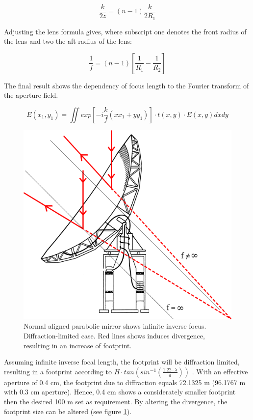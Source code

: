 \begin{equation} 
\frac{k}{2z}=(n-1)\frac{k}{2R_{1}}
\end{equation} 

Adjusting the lens formula gives, where subscript one denotes the front radius of the lens and two the aft radius of the lens:

\begin{equation} 
\frac{1}{f}=\left(n-1\right)\left[\frac{1}{R_{1}}-\frac{1}{R_{2}}\right]
\end{equation} 

The final result shows the dependency of focus length to the Fourier transform of the aperture field. 

\begin{equation} 
E(x_{1},y_{1})=\iint exp\left[-i\frac{k}{f}\left(xx_{1}+yy_{1}\right)\right]\cdot t(x,y)\cdot E(x,y) dx dy
\end{equation}


\begin{figure} [ht]
\centering
\includegraphics[scale=0.4]{chapters/img/optic_focus.png}	
\caption{Normal aligned parabolic mirror shows infinite inverse focus. Diffraction-limited case. Red lines shows induces divergence, resulting in an increase of footprint.}
\label{diff_div}
\end{figure}

Assuming infinite inverse focal length, the footprint will be diffraction limited, resulting in a footprint according to $H\cdot tan(sin^{-1}(\frac{1.22\cdot \lambda}{a}))$ \cite{fourieroptics}. With an effective aperture of 0.4 cm, the footprint due to diffraction equals 72.1325 m (96.1767 m with 0.3 cm aperture). Hence, 0.4 cm shows a considerately smaller footprint then the desired 100 m set as requirement. By altering the divergence, the footprint size can be altered (see figure \ref{diff_div}). 
 
